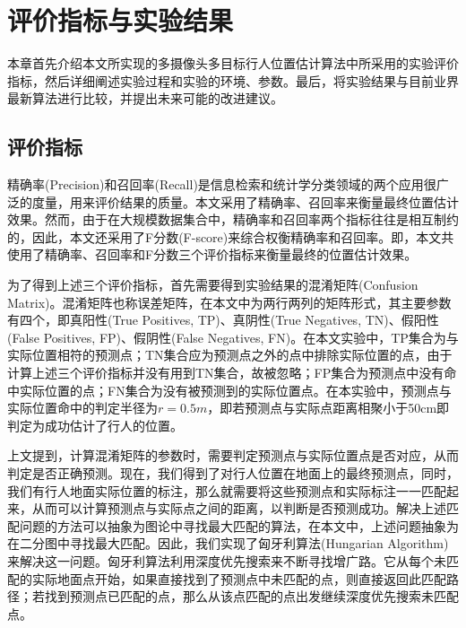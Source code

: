 
\chapter{评价指标与实验结果}

本章首先介绍本文所实现的多摄像头多目标行人位置估计算法中所采用的实验评价指标，然后详细阐述实验过程和实验的环境、参数。最后，将实验结果与目前业界最新算法进行比较，并提出未来可能的改进建议。

\section{评价指标}

精确率(Precision)和召回率(Recall)是信息检索和统计学分类领域的两个应用很广泛的度量，用来评价结果的质量。本文采用了精确率、召回率来衡量最终位置估计效果。然而，由于在大规模数据集合中，精确率和召回率两个指标往往是相互制约的，因此，本文还采用了F分数(F-score)来综合权衡精确率和召回率。即，本文共使用了精确率、召回率和F分数三个评价指标来衡量最终的位置估计效果。

为了得到上述三个评价指标，首先需要得到实验结果的混淆矩阵(Confusion Matrix)。混淆矩阵也称误差矩阵，在本文中为两行两列的矩阵形式，其主要参数有四个，即真阳性(True Positives, TP)、真阴性(True Negatives, TN)、假阳性(False Positives, FP)、假阴性(False Negatives, FN)。在本文实验中，TP集合为与实际位置相符的预测点；TN集合应为预测点之外的点中排除实际位置的点，由于计算上述三个评价指标并没有用到TN集合，故被忽略；FP集合为预测点中没有命中实际位置的点；FN集合为没有被预测到的实际位置点。在本实验中，预测点与实际位置命中的判定半径为$r=0.5m$，即若预测点与实际点距离相聚小于50cm即判定为成功估计了行人的位置。

上文提到，计算混淆矩阵的参数时，需要判定预测点与实际位置点是否对应，从而判定是否正确预测。现在，我们得到了对行人位置在地面上的最终预测点，同时，我们有行人地面实际位置的标注，那么就需要将这些预测点和实际标注一一匹配起来，从而可以计算预测点与实际点之间的距离，以判断是否预测成功。解决上述匹配问题的方法可以抽象为图论中寻找最大匹配的算法，在本文中，上述问题抽象为在二分图中寻找最大匹配。因此，我们实现了匈牙利算法(Hungarian Algorithm)来解决这一问题。匈牙利算法利用深度优先搜索来不断寻找增广路。它从每个未匹配的实际地面点开始，如果直接找到了预测点中未匹配的点，则直接返回此匹配路径；若找到预测点已匹配的点，那么从该点匹配的点出发继续深度优先搜索未匹配点。

